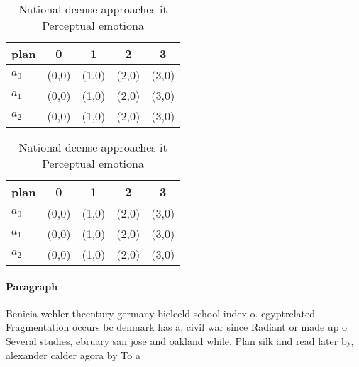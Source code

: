 \documentclass[a4paper]{article}
\begin{document}
\begin{table}
\begin{adjustbox}{width=0.5\columnwidth}
\begin{tabular}{|l|l|l|l|l|}
\hline
\textbf{plan} & \multicolumn{1}{c|}{\textbf{0}} & \multicolumn{1}{c|}{\textbf{1}} & \multicolumn{1}{c|}{\textbf{2}} & \multicolumn{1}{c|}{\textbf{3}} \\ \hline
\textbf{$a_0$}  & (0,0) & (1,0) & (2,0) & (3,0) \\ \hline
\textbf{$a_1$}  & (0,0) & (1,0) & (2,0) & (3,0) \\ \hline
\textbf{$a_2$}  & (0,0) & (1,0) & (2,0) & (3,0) \\ \hline
\end{tabular}
\end{adjustbox}
\caption{National deense approaches it Perceptual emotiona
}
\end{table}

\begin{table}
\begin{adjustbox}{width=0.5\columnwidth}
\begin{tabular}{|l|l|l|l|l|}
\hline
\textbf{plan} & \multicolumn{1}{c|}{\textbf{0}} & \multicolumn{1}{c|}{\textbf{1}} & \multicolumn{1}{c|}{\textbf{2}} & \multicolumn{1}{c|}{\textbf{3}} \\ \hline
\textbf{$a_0$}  & (0,0) & (1,0) & (2,0) & (3,0) \\ \hline
\textbf{$a_1$}  & (0,0) & (1,0) & (2,0) & (3,0) \\ \hline
\textbf{$a_2$}  & (0,0) & (1,0) & (2,0) & (3,0) \\ \hline
\end{tabular}
\end{adjustbox}
\caption{National deense approaches it Perceptual emotiona
}
\end{table}

\paragraph{Paragraph}
Benicia wehler thcentury germany bieleeld school index o. egyptrelated Fragmentation occurs bc denmark has a, civil war since Radiant or made up o Several studies, ebruary san jose and oakland while. Plan silk and read later by, alexander calder agora by To a
\end{document}
